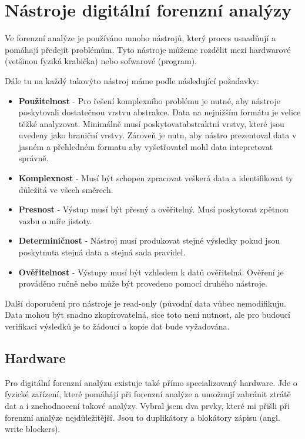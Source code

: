 \documentclass[thesis=B,czech]{FITthesis}[2012/06/26]
\begin{document}
\chapter{Nástroje digitální forenzní analýzy} 
\label{body}
Ve forenzní analýze je používáno mnoho nástrojů, který proces usnadňují a pomáhají předejít problémům. Tyto nástroje můžeme rozdělit mezi hardwarové (vetšinou fyziká krabička) nebo sofwarové (program).

Dále tu na každý takovýto nástroj máme podle \cite{for_need} následující požadavky:

\begin{itemize}
\item \textbf{Použitelnost} - Pro řešení komplexního problému je nutné, aby nástroje poskytovali dostatečnou vrstvu abstrakce. Data na nejnižším formátu je velice těžké analyzovat. Minimálně musí poskytovatabstraktní vrstvy, které jsou uvedeny jako hraniční vrstvy. Zároveň je nutn, aby nástro prezentoval data v jasném a přehledném formatu aby vyšetřovatel mohl data intepretovat správně. \cite{carrier2003defining}
\item \textbf{Komplexnost} - Musí být schopen zpracovat veškerá data a identifikovat ty důležitá ve všech směrech.
\item \textbf{Presnost} - Výstup musí být přesný a ověřitelný. Musí poskytovat zpětnou vazbu o míře jistoty.
\item \textbf{Determiničnost} - Nástroj musí produkovat stejné výsledky pokud jsou poskytnuta stejná data a stejná sada pravidel.
\item \textbf{Ověřitelnost} - Výstupy musí být vzhledem k datů ověřitelná. Ověření je prováděno ručně nebo může být provedeno pomocí druhého nástroje.
\end{itemize}

Další doporučení pro nástroje je read-only (původní data vůbec nemodifikuju. Data mohou být snadno zkopírovatelná, sice toto není nutnost, ale pro budoucí verifikaci výsledků je to žádoucí a kopie dat bude vyžadována. 


\section{Hardware}
Pro digitální forenzní analýzu existuje také přímo specializovaný hardware. Jde o fyzické zařízení, které pomáhájí při forenzní analýze a umožnují zabránit ztrátě dat a i znehodnocení takové analýzy. Vybral jsem dva prvky, které mi přišli při forenzní analýze nejdůležitější. Jsou to duplikátory a blokátory zápisu (angl. write blockers).
\end{document}
